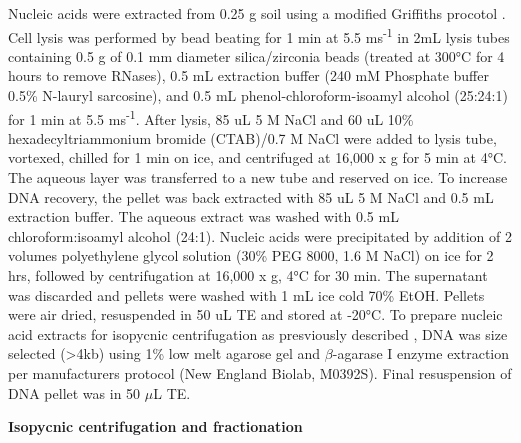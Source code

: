 Nucleic acids were extracted from 0.25 g soil using a modified Griffiths procotol \cite{Griffiths_2000}. Cell lysis was performed by bead beating for 1 min at 5.5 ms\textsuperscript{-1} in 2mL lysis tubes containing 0.5 g of 0.1 mm diameter silica/zirconia beads (treated at 300°C for 4 hours to remove RNases), 0.5 mL extraction buffer (240 mM Phosphate buffer 0.5\% N-lauryl sarcosine), and 0.5 mL phenol-chloroform-isoamyl alcohol (25:24:1) for 1 min at 5.5 ms\textsuperscript{-1}. After lysis, 85 uL 5 M NaCl and 60 uL 10\% hexadecyltriammonium bromide (CTAB)/0.7 M NaCl were added to lysis tube, vortexed, chilled for 1 min on ice, and centrifuged at 16,000 x g for 5 min at 4°C. The aqueous layer was transferred to a new tube and reserved on ice. To increase DNA recovery, the pellet was back extracted with 85 uL 5 M NaCl and 0.5 mL extraction buffer. The aqueous extract was washed with 0.5 mL chloroform:isoamyl alcohol (24:1). Nucleic acids were precipitated by addition of 2 volumes polyethylene glycol solution (30\% PEG 8000, 1.6 M NaCl) on ice for 2 hrs, followed by centrifugation at 16,000 x g, 4°C for 30 min. The supernatant was discarded and pellets were washed with 1 mL ice cold 70\% EtOH. Pellets were air dried, resuspended in 50 uL TE and stored at -20°C. To prepare nucleic acid extracts for isopycnic centrifugation as presviously described \cite{Buckley_2007}, DNA was size selected (\textgreater 4kb) using 1\% low melt agarose gel and $\beta$-agarase I enzyme extraction per manufacturers protocol (New England Biolab, M0392S).  Final resuspension of DNA pellet was in 50 $\mu$L TE.   


\textbf{Isopycnic centrifugation and fractionation}

